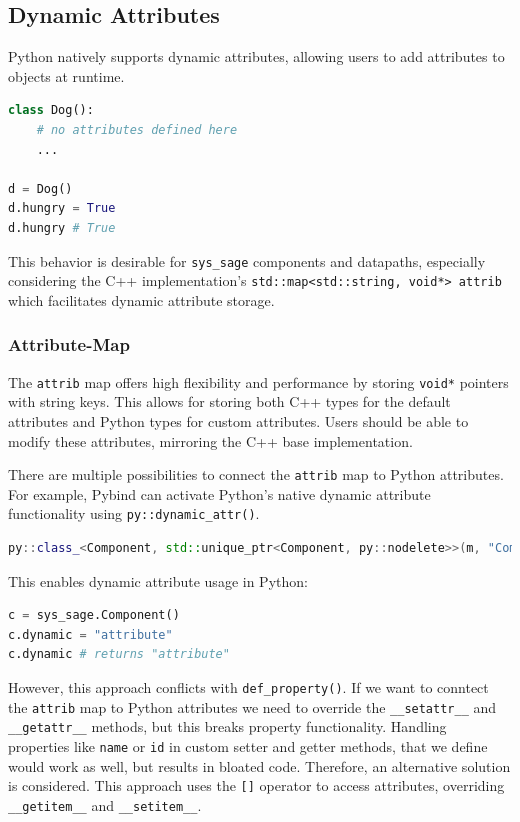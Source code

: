 \subsection{Dynamic Attributes}

Python natively supports dynamic attributes, allowing users to add attributes to objects at runtime.

\begin{lstlisting}[language=Python, xleftmargin=4em, frame = single]
class Dog():
    # no attributes defined here
    ...

d = Dog()
d.hungry = True
d.hungry # True
\end{lstlisting}

This behavior is desirable for \verb|sys_sage| components and datapaths, especially considering the C++ implementation's \verb|std::map<std::string, void*> attrib| which facilitates dynamic attribute storage.

\subsubsection{Attribute-Map}

The \verb|attrib| map offers high flexibility and performance by storing \verb|void*| pointers with string keys. This allows for storing both C++ types for the default attributes and Python types for custom attributes. Users should be able to modify these attributes, mirroring the C++ base implementation.

There are multiple possibilities to connect the \verb|attrib| map to Python attributes. For example, Pybind can activate Python's native dynamic attribute functionality using \verb|py::dynamic_attr()|.

\begin{lstlisting}[language=C++, xleftmargin=4em, frame = single]
py::class_<Component, std::unique_ptr<Component, py::nodelete>>(m, "Component", py::dynamic_attr(),"Generic Component");
\end{lstlisting}

This enables dynamic attribute usage in Python:

\begin{lstlisting}[language=Python, xleftmargin=4em, frame = single]
c = sys_sage.Component()
c.dynamic = "attribute"
c.dynamic # returns "attribute"
\end{lstlisting}

However, this approach conflicts with \verb|def_property()|. If we want to conntect the \verb|attrib| map to Python attributes we need to override the \verb|__setattr__| and \verb|__getattr__| methods, but this breaks property functionality. Handling properties like \verb|name| or \verb|id| in custom setter and getter methods, that we define would work as well, but results in bloated code. Therefore, an alternative solution is considered. This approach uses the \verb|[]| operator to access attributes, overriding \verb|__getitem__| and \verb|__setitem__|.

